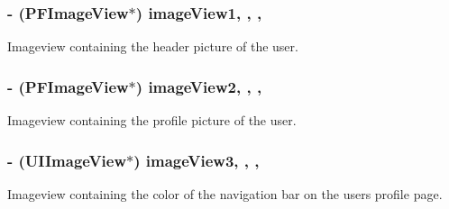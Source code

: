 \subsubsection[{image\+View1}]{\setlength{\rightskip}{0pt plus 5cm}-\/ (P\+F\+Image\+View$\ast$) image\+View1\hspace{0.3cm}{\ttfamily [read]}, {\ttfamily [write]}, {\ttfamily [nonatomic]}, {\ttfamily [strong]}}\label{interface_e_s_edit_profile_view_controller_ab454426b9cc4c42437e9a484a7bc12b1}
Imageview containing the header picture of the user. \hypertarget{interface_e_s_edit_profile_view_controller_af4aa914a55612c8cd5f145175af93093}{}
\subsubsection[{image\+View2}]{\setlength{\rightskip}{0pt plus 5cm}-\/ (P\+F\+Image\+View$\ast$) image\+View2\hspace{0.3cm}{\ttfamily [read]}, {\ttfamily [write]}, {\ttfamily [nonatomic]}, {\ttfamily [strong]}}\label{interface_e_s_edit_profile_view_controller_af4aa914a55612c8cd5f145175af93093}
Imageview containing the profile picture of the user. \hypertarget{interface_e_s_edit_profile_view_controller_a052c9b7e916228749c1cdbeb7d006ac2}{}
\subsubsection[{image\+View3}]{\setlength{\rightskip}{0pt plus 5cm}-\/ (U\+I\+Image\+View$\ast$) image\+View3\hspace{0.3cm}{\ttfamily [read]}, {\ttfamily [write]}, {\ttfamily [nonatomic]}, {\ttfamily [strong]}}\label{interface_e_s_edit_profile_view_controller_a052c9b7e916228749c1cdbeb7d006ac2}
Imageview containing the color of the navigation bar on the user\textquotesingle{}s profile page. \hypertarget{interface_e_s_edit_profile_view_controller_a7e40d43c7b337b92e03309abc2752d9b}{}

